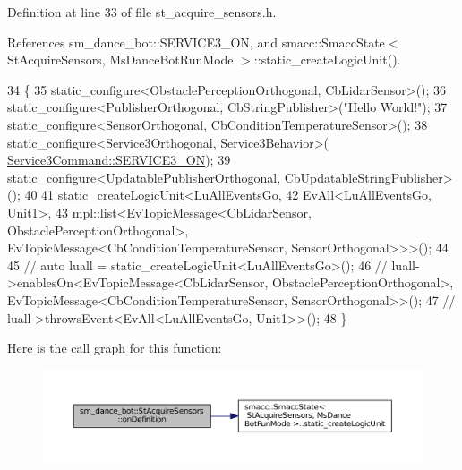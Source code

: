 Definition at line 33 of file st\+\_\+acquire\+\_\+sensors.\+h.



References sm\+\_\+dance\+\_\+bot\+::\+S\+E\+R\+V\+I\+C\+E3\+\_\+\+ON, and smacc\+::\+Smacc\+State$<$ St\+Acquire\+Sensors, Ms\+Dance\+Bot\+Run\+Mode $>$\+::static\+\_\+create\+Logic\+Unit().


\begin{DoxyCode}
34    \{
35       static\_configure<ObstaclePerceptionOrthogonal, CbLidarSensor>();
36       static\_configure<PublisherOrthogonal, CbStringPublisher>(\textcolor{stringliteral}{"Hello World!"});
37       static\_configure<SensorOrthogonal, CbConditionTemperatureSensor>();
38       static\_configure<Service3Orthogonal, Service3Behavior>(
      \hyperlink{namespacesm__dance__bot_a2d0902aa29698165effd2c3248a9c8ffa13cdca48a01bbb44fa8fb35567fbc58e}{Service3Command::SERVICE3\_ON});
39       static\_configure<UpdatablePublisherOrthogonal, CbUpdatableStringPublisher>();
40 
41       \hyperlink{classsmacc_1_1SmaccState_a6fc90cf59c60c749e82f49aafb079b23}{static\_createLogicUnit}<LuAllEventsGo,
42                              EvAll<LuAllEventsGo, Unit1>,
43                              mpl::list<EvTopicMessage<CbLidarSensor, ObstaclePerceptionOrthogonal>, 
      EvTopicMessage<CbConditionTemperatureSensor, SensorOrthogonal>>>();
44 
45       \textcolor{comment}{// auto luall = static\_createLogicUnit<LuAllEventsGo>();}
46       \textcolor{comment}{// luall->enablesOn<EvTopicMessage<CbLidarSensor, ObstaclePerceptionOrthogonal>,
       EvTopicMessage<CbConditionTemperatureSensor, SensorOrthogonal>>();}
47       \textcolor{comment}{// luall->throwsEvent<EvAll<LuAllEventsGo, Unit1>>();}
48    \}
\end{DoxyCode}


Here is the call graph for this function\+:
\nopagebreak
\begin{figure}[H]
\begin{center}
\leavevmode
\includegraphics[width=350pt]{structsm__dance__bot_1_1StAcquireSensors_ae30f4b633faa922070fc8412b6dd78fc_cgraph}
\end{center}
\end{figure}


